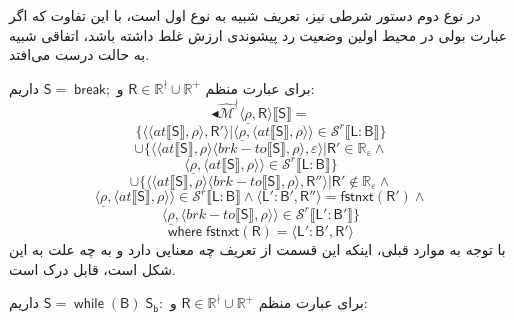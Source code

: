 در نوع دوم دستور شرطی نیز، تعریف شبیه به نوع اول است، با این تفاوت که اگر عبارت بولی در محیط اولین وضعیت رد پیشوندی ارزش غلط داشته باشد، اتفاقی شبیه به حالت درست می‌افتد.


 برای عبارت منظم 
 $\mathsf{R} \in \mathbb{R}^\nmid \cup \mathbb{R^+}$
 و 
 $\mathsf{S= \; break;}$
 داریم:
$$\blacktriangleleft \mathcal{\hat{M}^\nmid} \langle \underline{\rho}, \mathsf{R} \rangle 
\llbracket \mathsf{S} \rrbracket= $$
$$\{\langle \langle at \llbracket \mathsf{S} \rrbracket,\rho \rangle , \mathsf{R'} \rangle | \langle \underline{\rho} , \langle at \llbracket \mathsf{S} \rrbracket , \rho \rangle \rangle \in \mathcal{S}^r \llbracket \mathsf{L:B} \rrbracket\}$$
$$\cup \{ \langle \langle at \llbracket \mathsf{S} \rrbracket , \rho \rangle \langle brk-to \llbracket \mathsf{S} \rrbracket , \rho \rangle , \varepsilon \rangle | \mathsf{R'} \in \mathbb{R_\varepsilon} \land$$
$$\langle \underline{\rho}, \langle at \llbracket \mathsf{S} \rrbracket, \rho \rangle \rangle \in \mathcal{S}^r \llbracket \mathsf{L:B} \rrbracket \}$$
$$\cup \{ \langle \langle at \llbracket \mathsf{S} \rrbracket , \rho \rangle \langle brk-to \llbracket \mathsf{S} \rrbracket,\rho \rangle ,\mathsf{R''} \rangle | \mathsf{R'} \notin \mathbb{R_\varepsilon} \land$$
$$ \langle \underline{\rho},\langle at \llbracket \mathsf{S} \rrbracket , \rho \rangle \rangle \in \mathcal{S}^r \llbracket \mathsf{L:B} \rrbracket \land \langle \mathsf{L':B',R''} \rangle = \mathsf{fstnxt(R') \land}$$
$$\langle \underline{\rho}, \langle brk-to \llbracket \mathsf{S} \rrbracket, \rho \rangle \rangle \in \mathcal{S}^r \llbracket \mathsf{L':B'} \rrbracket \}$$
$$\mathsf{where\; fstnxt(R)=\langle L':B', R' \rangle}$$
 با توجه به موارد قبلی، اینکه این قسمت از تعریف چه معنایی دارد و به چه علت به این شکل است، قابل درک است.
 
 برای عبارت منظم 
 $\mathsf{R} \in \mathbb{R}^\nmid \cup \mathbb{R^+}$
 و 
 $\mathsf{S= \; while \; (B) \; S_b:}$
 داریم:
 
